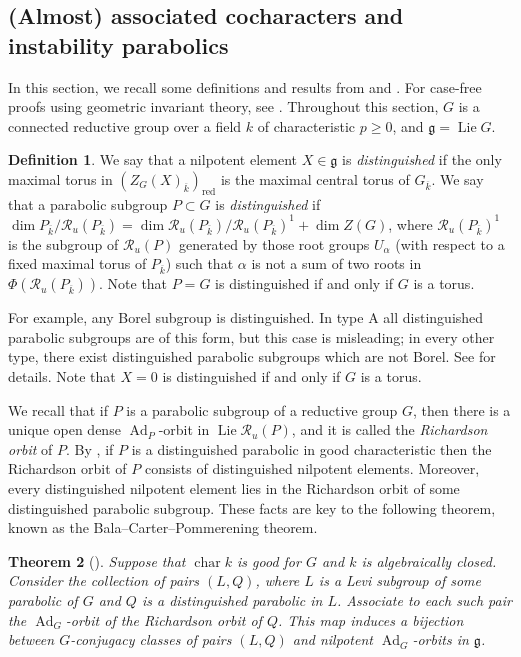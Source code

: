 \documentclass[11pt,reqno]{amsart}
\newtheorem{theorem}{Theorem}[section]
\theoremstyle{definition}
\newtheorem{definition}[theorem]{Definition}
\renewcommand{\rm}{\mathrm}
\newcommand{\sR}{{\mathscr R}}
\newcommand{\fg}{\mathfrak{g}}
\DeclareMathOperator{\Ad}{Ad}
\DeclareMathOperator{\chara}{char}
\DeclareMathOperator{\Lie}{Lie}
\begin{document}
\subsection{(Almost) associated cocharacters and instability parabolics}\label{subsection:associated-cocharacters}

In this section, we recall some definitions and results from \cite[\S 5]{Jantzen-nilpotent} and \cite{McNinch-nilpotent-orbits}. For case-free proofs using geometric invariant theory, see \cite{Premet}. Throughout this section, $G$ is a connected reductive group over a field $k$ of characteristic $p \geq 0$, and $\fg = \Lie G$.

\begin{definition}
We say that a nilpotent element $X \in \fg$ is \textit{distinguished} if the only maximal torus in $(Z_G(X)_{\overline{k}})_{\rm{red}}$ is the maximal central torus of $G_{\overline{k}}$. We say that a parabolic subgroup $P \subset G$ is \textit{distinguished} if $\dim P_{\overline{k}}/\sR_u(P_{\overline{k}}) = \dim \sR_u(P_{\overline{k}})/\sR_u(P_{\overline{k}})^1 + \dim Z(G)$, where $\sR_u(P_{\overline{k}})^1$ is the subgroup of $\sR_u(P)$ generated by those root groups $U_\alpha$ (with respect to a fixed maximal torus of $P_{\overline{k}}$) such that $\alpha$ is not a sum of two roots in $\Phi(\sR_u(P_{\overline{k}}))$. Note that $P = G$ is distinguished if and only if $G$ is a torus.
\end{definition}

For example, any Borel subgroup is distinguished. In type $\rm{A}$ all distinguished parabolic subgroups are of this form, but this case is misleading; in every other type, there exist distinguished parabolic subgroups which are not Borel. See \cite[\S 5.9]{Carter} for details. Note that $X = 0$ is distinguished if and only if $G$ is a torus. \smallskip

We recall that if $P$ is a parabolic subgroup of a reductive group $G$, then there is a unique open dense $\Ad_P$-orbit in $\Lie \sR_u(P)$, and it is called the \textit{Richardson orbit} of $P$. By \cite[4.13]{Jantzen-nilpotent}, if $P$ is a distinguished parabolic in good characteristic then the Richardson orbit of $P$ consists of distinguished nilpotent elements. Moreover, every distinguished nilpotent element lies in the Richardson orbit of some distinguished parabolic subgroup. These facts are key to the following theorem, known as the Bala--Carter--Pommerening theorem.

\begin{theorem}[{\cite[4.7, 4.13]{Jantzen-nilpotent}}]\label{theorem:bala-carter}
Suppose that $\chara k$ is good for $G$ and $k$ is algebraically closed. Consider the collection of pairs $(L, Q)$, where $L$ is a Levi subgroup of some parabolic of $G$ and $Q$ is a distinguished parabolic in $L$. Associate to each such pair the $\Ad_G$-orbit of the Richardson orbit of $Q$. This map induces a bijection between $G$-conjugacy classes of pairs $(L, Q)$ and nilpotent $\Ad_G$-orbits in $\fg$.
\end{theorem}
\end{document}
